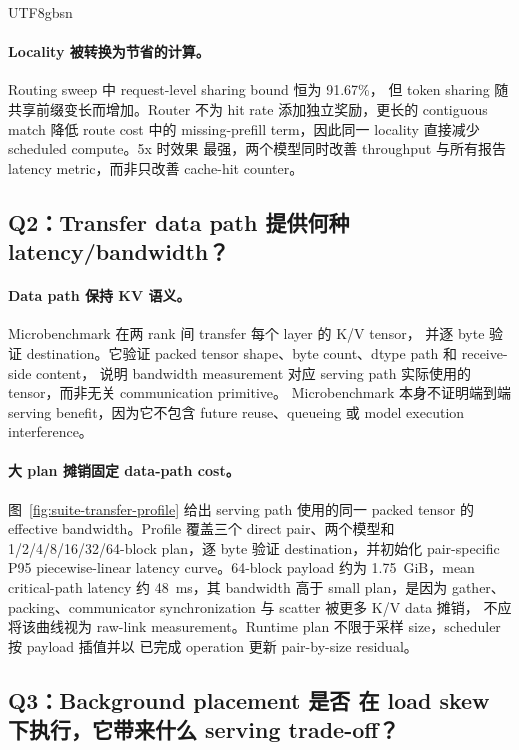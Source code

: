 \documentclass[11pt,a4paper]{article}
\begin{document}
\begin{CJK*}{UTF8}{gbsn}
\paragraph{Locality 被转换为节省的计算。} Routing sweep 中 request-level sharing bound 恒为 91.67\%，
但 token sharing 随共享前缀变长而增加。Router 不为 hit rate 添加独立奖励，更长的 contiguous match
降低 route cost 中的 missing-prefill term，因此同一 locality 直接减少 scheduled compute。5x 时效果
最强，两个模型同时改善 throughput 与所有报告 latency metric，而非只改善 cache-hit counter。

\subsection{Q2：Transfer data path 提供何种 latency/bandwidth？}

\paragraph{Data path 保持 KV 语义。} Microbenchmark 在两 rank 间 transfer 每个 layer 的 K/V tensor，
并逐 byte 验证 destination。它验证 packed tensor shape、byte count、dtype path 和 receive-side content，
说明 bandwidth measurement 对应 serving path 实际使用的 tensor，而非无关 communication primitive。
Microbenchmark 本身不证明端到端 serving benefit，因为它不包含 future reuse、queueing 或 model execution
interference。

\paragraph{大 plan 摊销固定 data-path cost。} 图~\ref{fig:suite-transfer-profile} 给出 serving path
使用的同一 packed tensor 的 effective bandwidth。Profile 覆盖三个 direct pair、两个模型和
1/2/4/8/16/32/64-block plan，逐 byte 验证 destination，并初始化 pair-specific P95 piecewise-linear
latency curve。64-block payload 约为 1.75~GiB，mean critical-path latency 约 48~ms，其 bandwidth 高于
small plan，是因为 gather、packing、communicator synchronization 与 scatter 被更多 K/V data 摊销，
不应将该曲线视为 raw-link measurement。Runtime plan 不限于采样 size，scheduler 按 payload 插值并以
已完成 operation 更新 pair-by-size residual。

\subsection{Q3：Background placement 是否
在 load skew 下执行，它带来什么 serving trade-off？}


\end{CJK*}
\end{document}
